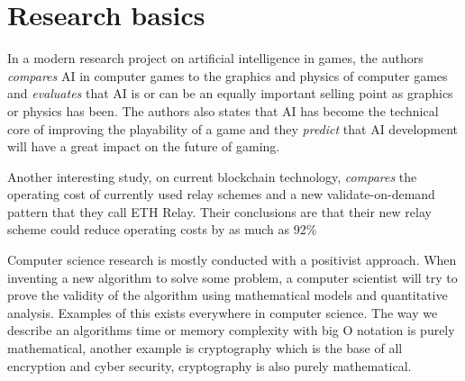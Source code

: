 \documentclass[11pt,a4paper]{article}
\begin{document}
\section{Research basics}
In a modern research project on artificial intelligence in games, the authors \textit{compares} AI in computer games to the graphics and physics
of computer games and \textit{evaluates} that AI is or can be an equally important selling point as graphics or physics has been\cite{ai_games}. 
The authors also states that AI has become the technical core of improving the playability of a game and they \textit{predict} that AI development
will have a great impact on the future of gaming.

Another interesting study, on current blockchain technology\cite{eth}, \textit{compares} the operating cost of currently used relay schemes and a new
validate-on-demand pattern that they call ETH Relay. Their conclusions are that their new relay scheme could reduce operating costs by as much as 92\%

Computer science research is mostly conducted with a positivist approach. When inventing a new algorithm to solve some problem, a computer scientist
will try to prove the validity of the algorithm using mathematical models and quantitative analysis. Examples of this exists everywhere in computer science.
The way we describe an algorithms time or memory complexity with big O notation is purely mathematical, another example is cryptography which is the base
of all encryption and cyber security, cryptography is also purely mathematical.



\end{document}
